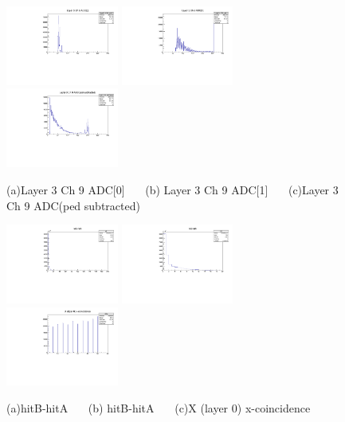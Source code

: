 \documentclass[a4paper,11pt]{article}
\theoremstyle{mytheor}
\begin{document}
\begin{figure}[H] 
\vspace*{-0.3cm} 
\includegraphics[width=0.33\textwidth,scale=0.5,trim=0 0 0 0,clip]{plotsdir/file0_test-Layer3_Ch9_adc0-1.pdf} 
\includegraphics[width=0.33\textwidth,scale=0.5,trim=0 0 0 0,clip]{plotsdir/file0_test-Layer3_Ch9_adc1-1.pdf} 
\includegraphics[width=0.33\textwidth,scale=0.5,trim=0 0 0 0,clip]{plotsdir/file0_test-Layer3_Ch9_adcPedsub-1.pdf} 
\caption{(a)Layer 3 Ch 9 ADC[0] ~~~(b) Layer 3 Ch 9 ADC[1] ~~~(c)Layer 3 Ch 9 ADC(ped subtracted) } 
\end{figure} 
\begin{figure}[H] 
\vspace*{-0.3cm} 
\includegraphics[width=0.33\textwidth,scale=0.5,trim=0 0 0 0,clip]{plotsdir/file0_test-dt-1.pdf} 
\includegraphics[width=0.33\textwidth,scale=0.5,trim=0 0 0 0,clip]{plotsdir/file0_test-dt2-1.pdf} 
\includegraphics[width=0.33\textwidth,scale=0.5,trim=0 0 0 0,clip]{plotsdir/file0_test-X0a-1.pdf} 
\caption{(a)hitB-hitA ~~~(b) hitB-hitA ~~~(c)X (layer 0) x-coincidence } 
\end{figure} 
\end{document}
